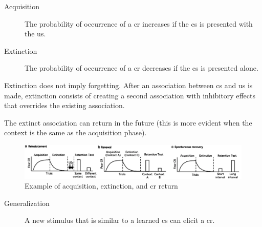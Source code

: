 \begin{description}
    \item[Acquisition] 
        The probability of occurrence of a \acl{cr} increases if the \acl{cs} is presented with the \acl{us}.
        
    \item[Extinction] 
        The probability of occurrence of a \acl{cr} decreases if the \acl{cs} is presented alone.
\end{description}

\begin{remark}
    Extinction does not imply forgetting.
    After an association between \ac{cs} and \ac{us} is made, 
    extinction consists of creating a second association with inhibitory effects that overrides the existing association.

    The extinct association can return in the future
    (this is more evident when the context is the same as the acquisition phase).

    \begin{figure}[H]
        \centering
        \includegraphics[width=0.95\linewidth]{./img/pavlovian_extinction.png}
        \caption{Example of acquisition, extinction, and \ac{cr} return}
    \end{figure}
\end{remark}


\begin{description}
    \item[Generalization]  
        A new stimulus that is similar to a learned \acl{cs} can elicit a \acl{cr}.
\end{description}

